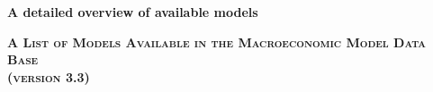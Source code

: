 \documentclass[11pt,a4paper]{article}
\begin{document}
	\begin{center}
		{\Large \textbf{A detailed overview of available models} }
		\par\end{center}
	
	
	
	\begin{center}
		\textsc{\textbf{A List of Models Available in the Macroeconomic Model Data Base} } \\
		\textsc{\textbf{(version 3.3)} }
	\end{center}
	\vfill
	
\end{document}
